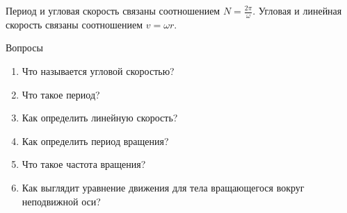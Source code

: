 \documentclass[a6paper, 11pt]{diss_4}
\renewcommand{\'}{\,'}
\begin{document}
  Период и угловая скорость связаны соотношением $N=\frac{2\pi}{\omega}$. Угловая и линейная
скорость связаны соотношением $v=\omega r$.

\begin{center}
   Вопросы
\end{center}
\begin{enumerate}
\item Что называется угловой скоростью?
\item Что такое период?
\item Как определить линейную скорость?
\item Как определить период вращения?
\item Что такое частота вращения?
\item Как выглядит уравнение движения для тела вращающегося вокруг неподвижной оси?
\end{enumerate}
\end{document}
